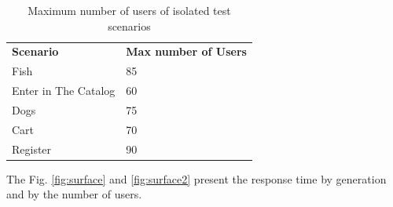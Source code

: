 \begin{table}[h!]
\centering
\caption{Maximum number of users of isolated test scenarios }
\label{tab:isolated}
\begin{tabular}{ll}
\rowcolor[HTML]{FFCCC9} 
\textbf{Scenario}    & \textbf{Max number of Users} \\
Fish                 & 85                           \\
Enter in The Catalog & 60                           \\
Dogs                 & 75                           \\
Cart                 & 70                           \\
Register             & 90                          
\end{tabular}
\end{table}

The Fig. \ref{fig:surface} and \ref{fig:surface2} present the response time by generation and by the number of users.


